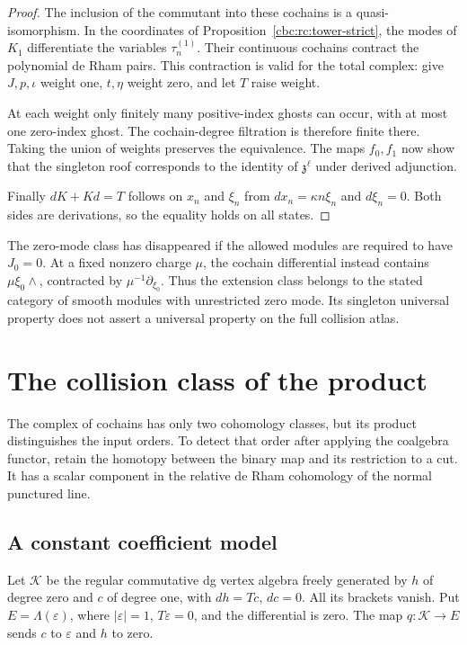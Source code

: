 \begin{proof}
The inclusion of the commutant into these cochains is a
quasi-isomorphism. In the coordinates of
Proposition~\ref{cbc:rc:tower-strict}, the modes of $K_1$
differentiate the variables $\tau_n^{(1)}$. Their continuous
cochains contract the polynomial de Rham pairs. This
contraction is valid for the total complex: give $J,p,\iota$
weight one, $t,\eta$ weight zero, and let $T$ raise weight.

At each weight only finitely many positive-index ghosts can
occur, with at most one zero-index ghost. The cochain-degree
filtration is therefore finite there. Taking the union of
weights preserves the equivalence. The maps $f_0,f_1$ now
show that the singleton roof corresponds to the identity of
$\mathfrak z^\ell$ under derived adjunction.

Finally $dK+Kd=T$ follows on $x_n$ and $\xi_n$ from
$dx_n=\kappa n\xi_n$ and $d\xi_n=0$. Both sides are
derivations, so the equality holds on all states.
\end{proof}

The zero-mode class has disappeared if the allowed modules
are required to have $J_0=0$. At a fixed nonzero charge
$\mu$, the cochain differential instead contains
$\mu\xi_0\wedge$, contracted by $\mu^{-1}\partial_{\xi_0}$.
Thus the extension class belongs to the stated category of
smooth modules with unrestricted zero mode. Its singleton
universal property does not assert a universal property on
the full collision atlas.

\section{The collision class of the product}
\label{cbc:rc:collision-class}

The complex of cochains has only two cohomology classes, but
its product distinguishes the input orders. To detect
that order after applying the coalgebra functor, retain the
homotopy between the binary map and its restriction to a cut.
It has a scalar component in the relative de Rham cohomology
of the normal punctured line.

\subsection{A constant coefficient model}

Let $\mathcal K$ be the regular commutative dg vertex algebra
freely generated by $h$ of degree zero and $c$ of degree one,
with $dh=Tc$, $dc=0$. All its brackets vanish. Put
$E=\Lambda(\varepsilon)$, where $|\varepsilon|=1$,
$T\varepsilon=0$, and the differential is zero.
The map $q:\mathcal K\to E$ sends $c$ to $\varepsilon$
and $h$ to zero.

